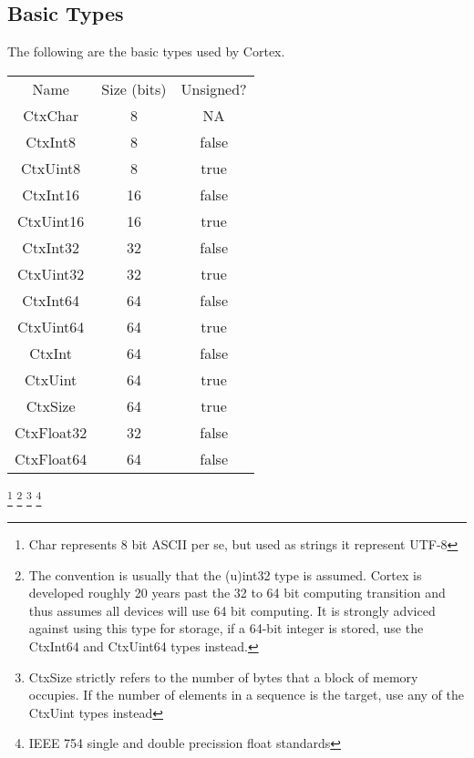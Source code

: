 \documentclass{report}
\begin{document}
\subsection{Basic Types}
The following are the basic types used by Cortex.
\begin{center}
\begin{tabular}{ c | c | c }
    Name        &Size (bits)& Unsigned? \\
    CtxChar\footnote[1]     & 8             & NA        \\ 
    CtxInt8     & 8         & false     \\  
    CtxUint8    & 8         & true      \\

    CtxInt16    & 16        & false     \\ 
    CtxUint16   & 16        & true      \\

    CtxInt32    & 32        & false    \\ 
    CtxUint32   & 32        & true     \\

    CtxInt64    & 64         & false    \\ 
    CtxUint64   & 64         & true     \\

    CtxInt\footnote[2] & 64  & false    \\ 
    CtxUint\footnote[2]& 64  & true     \\

    CtxSize\footnote[3]& 64  & true     \\

    CtxFloat32\footnote[4]& 32 & false \\
    CtxFloat64\footnote[4]& 64 & false \\

\end{tabular}
\end{center}
\footnote[1]{Char represents 8 bit ASCII per se, but used as strings it represent UTF-8}
\footnote[2]{The convention is usually that the (u)int32 type is assumed. 
Cortex is developed roughly 20 years past the 32 to 64 bit computing transition and thus assumes all devices will use 64 bit computing.
It is strongly adviced against using this type for storage, if a 64-bit integer is stored, use the CtxInt64 and CtxUint64 types instead.}
\footnote[3]{CtxSize strictly refers to the number of bytes that a block of memory occupies. If the number of elements in a sequence is the target, use any of the CtxUint types instead}
\footnote[4]{IEEE 754 single and double precission float standards}
\end{document}
